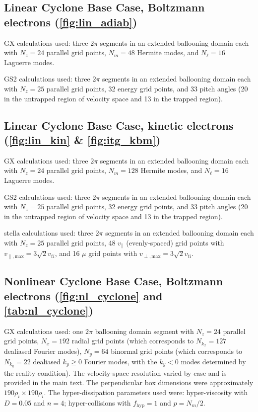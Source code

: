 \documentclass{jpp}
\newcommand{\GX}{{GX}\xspace}
\begin{document}
\subsection{Linear Cyclone Base Case, Boltzmann electrons (\cref{fig:lin_adiab})}
\GX calculations used: three $2\pi$ segments in an extended ballooning domain each with $N_z=24$ parallel grid points, $N_m=48$ Hermite modes, and $N_\ell=16$ Laguerre modes. 

GS2 calculations used: three $2\pi$ segments in an extended ballooning domain each with $N_z=25$ parallel grid points, 32 energy grid points, and 33 pitch angles (20 in the untrapped region of velocity space and 13 in the trapped region). 

\subsection{Linear Cyclone Base Case, kinetic electrons (\cref{fig:lin_kin} \& \cref{fig:itg_kbm})}
\GX calculations used: three $2\pi$ segments in an extended ballooning domain each with $N_z=24$ parallel grid points, $N_m=128$ Hermite modes, and $N_\ell=16$ Laguerre modes.

GS2 calculations used: three $2\pi$ segments in an extended ballooning domain each with $N_z=25$ parallel grid points, 32 energy grid points, and 33 pitch angles (20 in the untrapped region of velocity space and 13 in the trapped region).

stella calculations used: three $2\pi$ segments in an extended ballooning domain each with $N_z=25$ parallel grid points, 48 $v_\parallel$ (evenly-spaced) grid points with $v_{\parallel,\mathrm{max}}=3\sqrt{2} v_{ti}$, and 16 $\mu$ grid points with $v_{\perp,\mathrm{max}} = 3\sqrt{2} v_{ti}$. 

\subsection{Nonlinear Cyclone Base Case, Boltzmann electrons (\cref{fig:nl_cyclone} and \cref{tab:nl_cyclone})} \label{app:resolution_nl_cyclone}
\GX calculations used: one $2\pi$ ballooning domain segment with $N_z=24$ parallel grid points, $N_x=192$ radial grid points (which corresponds to $N_{k_x}=127$ dealiased Fourier modes), $N_y=64$ binormal grid points (which corresponds to $N_{k_y}=22$ dealiased $k_y\geq0$ Fourier modes, with the $k_y<0$ modes determined by the reality condition). The velocity-space resolution varied by case and is provided in the main text. The perpendicular box dimensions were approximately $190\rho_i\times 190\rho_i$. The hyper-dissipation parameters used were: hyper-viscosity with $D=0.05$ and $n=4$; hyper-collisions with $f_\mathrm{hyp}=1$ and $p=N_m/2$.
\end{document}
